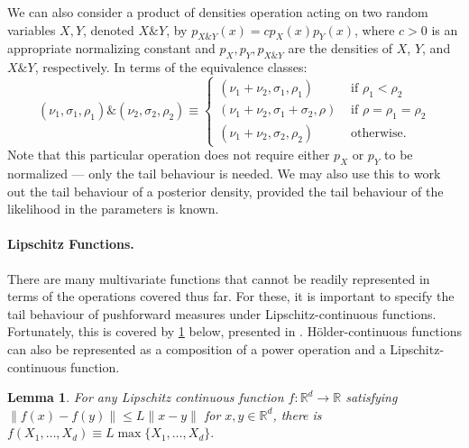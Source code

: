 \documentclass{article}
\newtheorem{lemma}[theorem]{Lemma}
\theoremstyle{definition}
\begin{document}
We can also consider a product of densities operation acting on two random variables $X,Y$, denoted $X \& Y$, by
$p_{X \& Y}(x) = c p_X(x) p_Y(x)$,
where $c > 0$ is an appropriate normalizing constant and $p_X,p_Y,p_{X\& Y}$ are the densities of $X$, $Y$, and $X \& Y$, respectively. In terms of the equivalence classes:
\[
(\nu_1,\sigma_1,\rho_1)\&(\nu_2,\sigma_2,\rho_2) 
\equiv \begin{cases}
(\nu_{1}+\nu_{2},\sigma_{1},\rho_{1}) & \text{ if }\rho_{1}<\rho_{2}\\
(\nu_{1}+\nu_{2},\sigma_{1}+\sigma_{2},\rho) & \text{ if }\rho=\rho_{1}=\rho_{2}\\
(\nu_{1}+\nu_{2},\sigma_{2},\rho_{2}) & \text{ otherwise.}
\end{cases}
\]
Note that this particular operation does not require either $p_X$ or $p_Y$ to be normalized --- only the tail behaviour is needed. We may also use this to work out the tail behaviour of a posterior density, provided the tail behaviour of the likelihood in the parameters is known.

\paragraph{Lipschitz Functions.}

There are many multivariate functions that cannot be readily represented in terms of the operations covered thus far. For these, it is important to specify the tail behaviour of pushforward measures under Lipschitz-continuous functions. Fortunately, this is covered by \cref{lem:lipschitz} below, presented in \cite[Proposition 1.3]{ledoux2001concentration}. 
H\"{o}lder-continuous functions can also be represented as a composition of a power operation and a Lipschitz-continuous function. 
\begin{lemma}\label{lem:lipschitz}
For any Lipschitz continuous function $f:\mathbb{R}^d \to \mathbb{R}$ satisfying $\|f(x)-f(y)\|\leq L\|x -y\|$ for $x,y \in \mathbb{R}^d$, there is $f(X_1,\dots,X_d) \equiv L \max\{X_1,\dots,X_d\}.$
\end{lemma}
\end{document}
